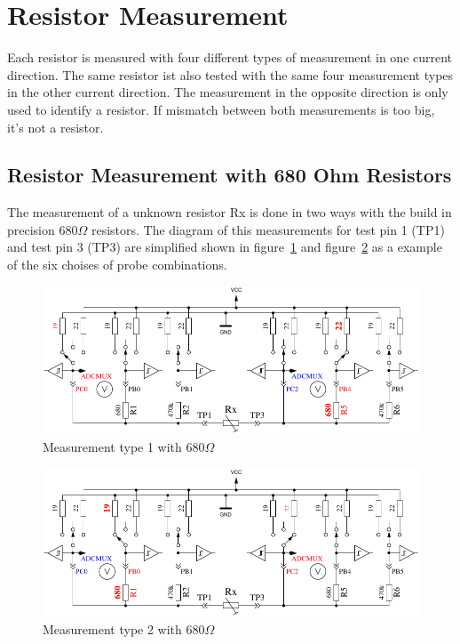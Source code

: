 \section{Resistor Measurement}
Each resistor is measured with four different types of measurement in one current direction.
The same resistor ist also tested with the same four measurement types in the other current direction.
The measurement in the opposite direction is only used to identify a resistor.
If mismatch between both measurements is too big, it's not a resistor.

\subsection{Resistor Measurement with 680 Ohm Resistors}
The measurement of a unknown resistor Rx is done in two ways with the build in precision
 \(680\Omega\) resistors. The diagram of this measurements for test pin 1 (TP1) and test pin 3 (TP3) are
 simplified shown in figure~\ref{fig:RL1mes} and figure~\ref{fig:RL2mes} as a example of the six choises of probe combinations.

\begin{figure}[H]
\centering
\includegraphics[]{../FIG/ResistormessL1.pdf}
\caption{Measurement type 1 with \(680\Omega\) }
\label{fig:RL1mes}
\end{figure}

\begin{figure}[H]
 \centering
 \includegraphics[]{../FIG/ResistormessL2.pdf}
 \caption{Measurement type 2 with \(680\Omega\) }
\label{fig:RL2mes}
\end{figure}

